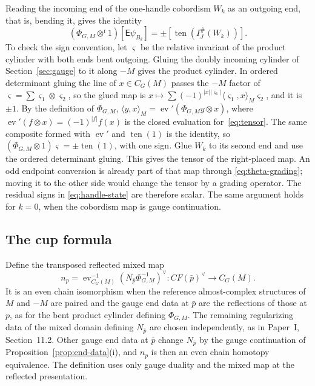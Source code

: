 \documentclass[11pt]{amsart}
\theoremstyle{definition}
\theoremstyle{remark}
\theoremstyle{plain}
\numberwithin{equation}{section}
\newcommand{\CF}{\mathit{CF}}
\newcommand{\IG}{I^{\#}_{J}}
\newcommand{\ev}{\operatorname{ev}}
\newcommand{\ten}{\operatorname{ten}}
\begin{document}
Reading the incoming end of the one-handle
cobordism $W_k$ as an outgoing end, that is,
bending it, gives the identity
\begin{equation}\label{eq:handle-state}
 (\Phi_{G,M}\otimes^{\mathrm r}1)[\mathsf E\psi_{B_k}]
       =\pm[\ten(\IG(W_k))].
\end{equation}
To check the sign convention, let $\varsigma$ be the
relative invariant of the product cylinder with both ends bent
outgoing. Gluing the doubly incoming cylinder of
Section~\ref{sec:gauge} to it along $-M$ gives the
product cylinder. In ordered determinant gluing the
line of $x\in C_G(M)$ passes the $-M$ factor of
$\varsigma=\sum\varsigma_1\otimes\varsigma_2$, so the glued map is
$x\mapsto\sum(-1)^{|x||\varsigma_1|}\langle\varsigma_1,x\rangle_M\varsigma_2$,
and it is $\pm1$. By the definition of $\Phi_{G,M}$,
$\langle y,x\rangle_M=\ev'(\Phi_{G,M}y\otimes x)$, where
$\ev'(f\otimes x)=(-1)^{|f|}f(x)$ is the closed
evaluation for~\eqref{eq:tensor}. The same composite
formed with $\ev'$ and $\ten(1)$ is the identity, so
$(\Phi_{G,M}\otimes1)\varsigma=\pm\ten(1)$, with one sign. Glue $W_k$ to its second
end and use the ordered determinant gluing.
This gives the tensor of the right-placed
map. An odd endpoint conversion is already
part of that map through
\eqref{eq:theta-grading}; moving it to the
other side would change the tensor by a
grading operator. The residual signs in
\eqref{eq:handle-state} are therefore scalar.
The same argument holds for $k=0$, when the
cobordism map is gauge continuation.

\subsection{The cup formula}\label{subsec:cup-formula}
Define the transposed reflected mixed map
\begin{equation}\label{eq:n-p}
 n_p=\ev_{C_G(M)}^{-1}
       (N_{\bar p}\Phi_{G,M}^{-1})^\vee:
       \CF(\bar p)^\vee\longrightarrow C_G(M).
\end{equation}
It is an even chain isomorphism when the
reference almost-complex structures of $M$ and
$-M$ are paired and the gauge end data at $\bar p$
are the reflections of those at $p$, as for the
bent product cylinder defining $\Phi_{G,M}$. The
remaining regularizing data of the mixed domain
defining $N_{\bar p}$ are chosen independently, as in Paper~I,
Section~11.2. Other gauge end data at $\bar p$
change $N_{\bar p}$ by the gauge continuation of
Proposition~\ref{prop:end-data}(i), and $n_p$ is
then an even chain homotopy equivalence. The
definition uses only gauge duality and the mixed
map at the reflected presentation.
\end{document}
